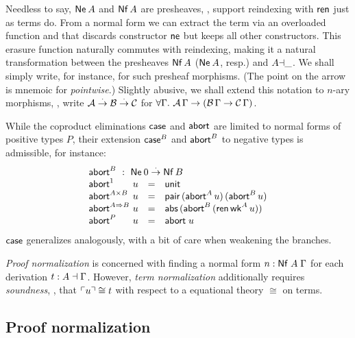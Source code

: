 \documentclass[a4paper,USenglish,cleveref, autoref]{lipics-v2019}
\begin{document}
Needless to say, $\mathsf{Ne}^{}\,A$ and
$\mathsf{Nf}\,A$ are presheaves, \ie, support reindexing with $\mathsf{ren}$ just as terms do.
From a normal form we can extract the term via an overloaded function
 and
that discards constructor $\mathsf{ne}$ but keeps all other constructors.
This erasure function naturally commutes with reindexing, making it a
natural transformation between the presheaves $\mathsf{Nf}\,A$ ($\mathsf{Ne}^{}\,A$,
resp.) and $A{\dashv}\_$.  We shall simply write, for instance,
 for such presheaf morphisms.
(The point on the arrow is mnemoic for \emph{pointwise}.)
Slightly abusive, we shall extend this notation to $n$-ary
morphisms, \eg, write $\mathcal{A} \stackrel{\cdot}{\to} \mathcal{B} \stackrel{\cdot}{\to} \mathcal{C}$ for
$\forall \Gamma.\ \mathcal{A}\,\Gamma \to (\mathcal{B}\,\Gamma \to \mathcal{C}\,\Gamma)$.

While the coproduct eliminations $\mathsf{case}$ and $\mathsf{abort}$ are limited to
normal forms of positive types $P$, their extension $\mathsf{case}^B$ and
$\mathsf{abort}^B$ to negative types
is admissible, for instance:
\[
\begin{array}{l@{~}lcl}
  \multicolumn 4 l {\tabort^B ~:~ \tNe\, 0 \todot \tNf\,B} \\
  \tabort^{\tyone}     & u & = & \tunit \\
  \tabort^{A \times B} & u & = & \tpair\,(\tabort^A\,u)\,(\tabort^B\,u) \\
  \tabort^{A \To B}    & u & = & \tabs\,(\tabort^B\,(\tren\,\twk^A\,u)) \\
  \tabort^P           & u & = & \tabort\;u \\
\end{array}
\]
$\mathsf{case}$ generalizes analogously, with a bit of care when weakening
the branches.

\emph{Proof normalization} is concerned with finding a normal form
$n : \mathsf{Nf}\;A\;\Gamma$ for each derivation $t : A \dashv \Gamma$.  However,
\emph{term normalization} additionally requires \emph{soundness},
\ie, that $\ulcorner u\urcorner \cong t$
with respect to a equational theory $\cong$ on terms.

\subsection{Proof normalization}
\end{document}

